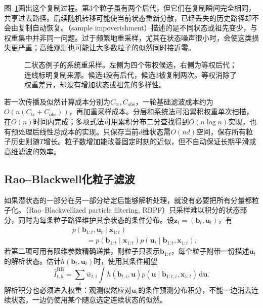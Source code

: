 图~\ref{fig:pgm-sampling-resampling}画出这个复制过程。第$3$个粒子虽有两个后代，但它们在复制瞬间完全相同，共享过去路径。后续随机转移可能使当前状态重新分散，已经丢失的历史路径却不会由复制自动恢复。（sample impoverishment）描述的是不同状态或祖先变少，与权重集中并非同一问题。过于频繁地重采样，尤其在状态噪声很小时，会使这类损失更严重；高维观测也可能让大多数粒子的似然同时接近零。

\begin{figure}[htbp]
  \centering
  
  \caption{二状态例子的系统重采样。左侧为四个带权候选，右侧为等权后代；连线标明复制来源。候选$4$没有后代，候选$3$被复制两次。等权消除了权重差异，却没有增加状态或祖先的多样性。}
  \label{fig:pgm-sampling-resampling}
\end{figure}

若一次传播及似然计算成本分别为$C_{\mathrm{tr}},C_{\mathrm{obs}}$，一轮基础滤波成本约为$O(n(C_{\mathrm{tr}}+C_{\mathrm{obs}}))$，再加重采样成本。分层和系统法可沿累积权重单次扫描，在$O(n)$时间内完成；多项式法可用累积分布二分查找得到$O(n\log n)$实现，也有预处理后线性总成本的实现。只保存当前$d$维状态需$O(nd)$空间，保存所有粒子历史则随$T$增长。粒子数增加能改善固定时刻的近似，但不自动保证长期平滑或高维滤波的效率。

\subsection{Rao--Blackwell化粒子滤波}
\label{sec:pgm-sampling-rbpf}

如果潜状态的一部分在另一部分给定后能够解析处理，就没有必要把所有分量都粒子化。（Rao--Blackwellized particle filtering, RBPF）只采样难以积分的状态部分，同时为每条粒子路径维护其余状态的条件分布。设$\bm{z}_t=(\bm{b}_t,\bm{u}_t)$，有
\begin{equation}
  \begin{aligned}
    &p(\bm{b}_{1:t},\bm{u}_t\mid\bm{x}_{1:t})\\
    &\qquad=p(\bm{b}_{1:t}\mid\bm{x}_{1:t})
        p(\bm{u}_t\mid\bm{b}_{1:t},\bm{x}_{1:t}).
  \end{aligned}
  \label{eq:pgm-sampling-rbpf-factor}
\end{equation}
若第二项可用有限维参数精确递推，则粒子只表示$\bm{b}_{1:t}$，每个粒子附带一份描述$\bm{u}_t$的解析状态。估计$h(\bm{b}_t,\bm{u}_t)$时，使用其条件期望
\[
  \widehat I_{t,h}^{\mathrm{RB}}
    =\sum_i\bar w_{t,i}
      \int h(\bm{b}_{t,i},\bm{u})
       p(\bm{u}\mid\bm{b}_{1:t,i},\bm{x}_{1:t})\,\mathrm{d}\bm{u}.
\]
解析积分也必须进入权重：观测似然应对$\bm{u}_t$的条件预测分布积分，不能一边消去连续状态，一边仍使用某个随意选定连续状态的似然。

